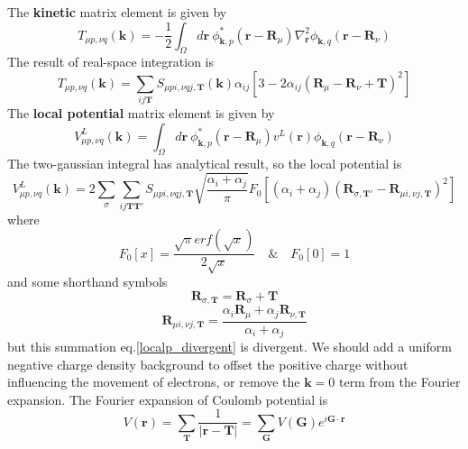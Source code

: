 \documentclass{article}
\begin{document}
            The \textbf{kinetic} matrix element is given by
            \begin{equation}
                T_{\mu p,\nu q}(\textbf{k}) = -\frac{1}{2}\int_{\Omega}d\textbf{r}\ \phi_{\textbf{k},p}^*(\textbf{r}-\textbf{R}_{\mu})\nabla_{\textbf{r}}^2\phi_{\textbf{k},q}(\textbf{r}-\textbf{R}_{\nu})
            \end{equation}
            The result of real-space integration is  
            \begin{equation}
                T_{\mu p,\nu q}(\textbf{k}) = \sum_{ij\textbf{T}}S_{\mu pi,\nu qj,\textbf{T}}(\textbf{k})
                \alpha_{ij}\left[3-2\alpha_{ij}(\textbf{R}_{\mu}-\textbf{R}_{\nu}+\textbf{T})^2\right]
            \end{equation}
            The \textbf{local potential} matrix element is given by
            \begin{equation}
                V_{\mu p,\nu q}^L(\textbf{k}) = \int_{\Omega}d\textbf{r}\ \phi_{\textbf{k},p}^*(\textbf{r}-\textbf{R}_{\mu})v^L(\textbf{r})\phi_{\textbf{k},q}(\textbf{r}-\textbf{R}_{\nu})
            \end{equation}
            The two-gaussian integral has analytical result, so the local potential is
            \begin{equation}
                V_{\mu p,\nu q}^L(\textbf{k}) = 2\sum_{\sigma}\sum_{ij\textbf{T}\textbf{T}'}S_{\mu pi,\nu qj,\textbf{T}}\sqrt{\frac{\alpha_i+\alpha_j}{\pi}}F_0\left[(\alpha_i+\alpha_j)(\textbf{R}_{\sigma,\textbf{T}'}-\textbf{R}_{\mu i,\nu j,\textbf{T}})^2\right]\label{localp_divergent}
            \end{equation}
            where
            $$ F_0\left[x\right] = \frac{\sqrt{\pi}erf(\sqrt{x})}{2\sqrt{x}} \quad \& \quad F_0\left[0\right] = 1 $$
            and some shorthand symbols
            $$ \textbf{R}_{\sigma,\textbf{T}} = \textbf{R}_{\sigma} +\textbf{T} $$
            $$ \textbf{R}_{\mu i,\nu j,\textbf{T}} = \frac{\alpha_i\textbf{R}_{\mu}+\alpha_j\textbf{R}_{\nu,\textbf{T}}}{\alpha_i+\alpha_j} $$
            but this summation eq.\eqref{localp_divergent} is divergent.
            We should add a uniform negative charge density background to offset the positive charge without influencing the movement of electrons,
            or remove the $\textbf{k}=0$ term from the Fourier expansion.
            The Fourier expansion of Coulomb potential is
            \begin{equation}
                V(\textbf{r}) = \sum_{\textbf{T}}\frac{1}{|\textbf{r}-\textbf{T}|}
                = \sum_{\textbf{G}}V(\textbf{G})e^{i\textbf{G}\cdot\textbf{r}}
            \end{equation}
\end{document}

